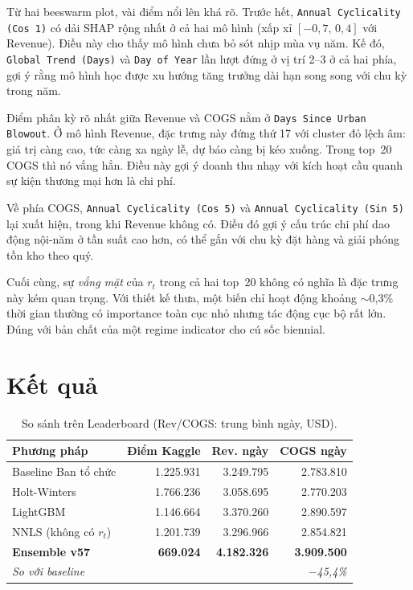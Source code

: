\documentclass{article}
\begin{document}
Từ hai beeswarm plot, vài điểm nổi lên khá rõ. Trước hết,
\texttt{Annual Cyclicality (Cos~1)} có dải SHAP rộng nhất ở cả hai mô hình
(xấp xỉ $[-0{,}7,\, 0{,}4]$ với Revenue). Điều này cho thấy mô hình chưa bỏ sót
nhịp mùa vụ năm. Kế đó,
\texttt{Global Trend (Days)} và \texttt{Day of Year} lần lượt đứng ở vị trí 2--3
ở cả hai phía, gợi ý rằng mô hình học được xu hướng tăng trưởng dài hạn song
song với chu kỳ trong năm.

Điểm phân kỳ rõ nhất giữa Revenue và COGS nằm ở \texttt{Days Since Urban
Blowout}. Ở mô hình Revenue, đặc trưng này đứng thứ 17 với cluster đỏ lệch âm:
giá trị càng cao, tức càng xa ngày lễ, dự báo càng bị kéo xuống. Trong top~20
COGS thì nó vắng hẳn. Điều này gợi ý doanh thu nhạy với kích hoạt cầu quanh sự
kiện thương mại hơn là chi phí.

Về phía COGS, \texttt{Annual Cyclicality (Cos~5)} và
\texttt{Annual Cyclicality (Sin~5)} lại xuất hiện, trong khi Revenue không có.
Điều đó gợi ý cấu trúc chi phí dao động nội-năm ở tần suất cao hơn, có thể gắn
với chu kỳ đặt hàng và giải phóng tồn kho theo quý.

Cuối cùng, sự \emph{vắng mặt} của $r_t$ trong cả hai top~20 không có nghĩa là
đặc trưng này kém quan trọng. Với thiết kế thưa, một biến chỉ hoạt động khoảng
$\sim$0,3\% thời gian thường có importance toàn cục nhỏ nhưng tác động cục bộ
rất lớn. Đúng với bản chất của một regime indicator cho cú sốc biennial.

\section{Kết quả}
\label{sec:results}

\begin{table}[H]
  \vspace{-2pt}
  \caption{So sánh trên Leaderboard (Rev/COGS: trung bình ngày, USD).}
  \label{tab:leaderboard}
  \centering
  \small
  \begin{tabular}{lrrr}
    \toprule
    \textbf{Phương pháp} & \textbf{Điểm Kaggle} &
    \textbf{Rev. ngày} & \textbf{COGS ngày} \\
    \midrule
    Baseline Ban tổ chức  & 1.225.931 & 3.249.795 & 2.783.810 \\
    Holt-Winters          & 1.766.236 & 3.058.695 & 2.770.203 \\
    LightGBM              & 1.146.664 & 3.370.260 & 2.890.597 \\
    NNLS (không có $r_t$) & 1.201.739 & 3.296.966 & 2.854.821 \\
    \textbf{Ensemble v57} & \textbf{669.024} &
      \textbf{4.182.326} & \textbf{3.909.500} \\
    \midrule
    \multicolumn{2}{l}{\emph{So với baseline}} &
      \multicolumn{2}{r}{\emph{$-$45,4\%}} \\
    \bottomrule
  \end{tabular}
  \vspace{-4pt}
\end{table}
\end{document}
